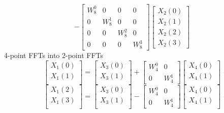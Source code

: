 \documentclass[journal,12pt,twocolumn]{IEEEtran}
\renewcommand\thesection{\arabic{section}}
\begin{document}
\begin{enumerate}[label=\arabic*.,ref=\thesection.\theenumi]
\begin{equation}
		-
		\begin{bmatrix}
			W^{0}_{8} & 0 & 0 & 0\\
			0 & W^{1}_{8} & 0 & 0\\
			0 & 0 & W^{2}_{8} & 0\\
			0 & 0 & 0 & W^{3}_{8}
		\end{bmatrix}
		\begin{bmatrix}
			X_{2}(0) \\ 
			X_{2}(1) \\ 
			X_{2}(2) \\
			X_{2}(3)
		\end{bmatrix}
	\end{equation}
	4-point FFTs into 2-point FFTs
	\begin{equation}
		\begin{bmatrix}
			X_{1}(0) \\ 
			X_{1}(1)\\ 
		\end{bmatrix}
		=
		\begin{bmatrix}
			X_{3}(0) \\ 
			X_{3}(1)\\ 
		\end{bmatrix}
		+
		\begin{bmatrix}
			W^{0}_{4} & 0\\
			0 & W^{1}_{4}
		\end{bmatrix}
		\begin{bmatrix}
			X_{4}(0) \\ 
			X_{4}(1) \\ 
		\end{bmatrix}
	\end{equation}
	\begin{equation}
		\begin{bmatrix}
			X_{1}(2) \\ 
			X_{1}(3)\\ 
		\end{bmatrix}
		=
		\begin{bmatrix}
			X_{3}(0) \\ 
			X_{3}(1)\\ 
		\end{bmatrix}
		-
		\begin{bmatrix}
			W^{0}_{4} & 0\\
			0 & W^{1}_{4}
		\end{bmatrix}
		\begin{bmatrix}
			X_{4}(0) \\ 
			X_{4}(1) \\ 
		\end{bmatrix}

\end{equation}
\end{enumerate}
\end{document}
